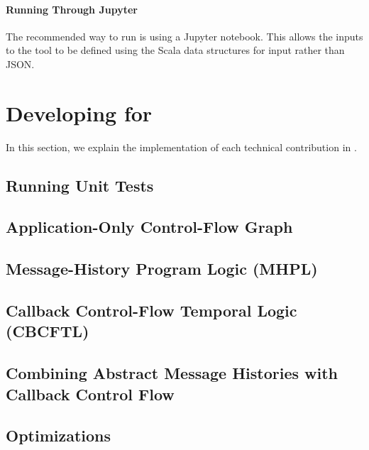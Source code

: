 \documentclass{acmart} %
\newcommand{\inputsection}[1]{\ifthenelse{\boolean{#1}}{}{\TODO{====== temp exclusion section #1 for build =======}}}
\begin{document}
\paragraph{Running \toolname Through Jupyter}
The recommended way to run \toolname is using a Jupyter notebook.  This allows the inputs to the tool to be defined using the Scala data structures for input rather than JSON.





\section{Developing for \toolname}

In this section, we explain the implementation of each technical contribution in \toolname.

\subsection{Running Unit Tests}



\subsection{Application-Only Control-Flow Graph}

\TODO{}

\subsection{Message-History Program Logic (MHPL)}

\TODO{}

\subsection{Callback Control-Flow Temporal Logic (CBCFTL)}

\TODO{}

\subsection{Combining Abstract Message Histories with Callback Control Flow}

\TODO{}

\subsection{Optimizations}

\TODO{}




\end{document}
